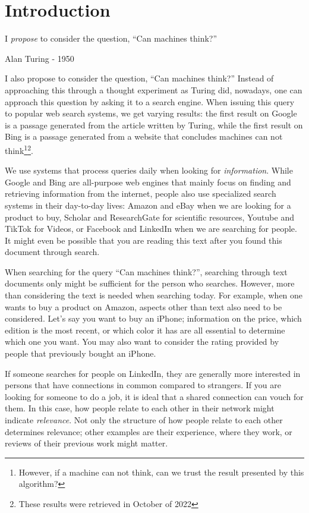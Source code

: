\chapter{Introduction}
\label{chp:introduction}
\epigraph{I \textit{propose} to consider the question, ``Can machines think?''}{Alan Turing - 1950}

I also propose to consider the question, ``Can machines think?'' Instead of approaching this through a thought experiment as Turing did, nowadays, one can approach this question by asking it to a search engine. When issuing this query to popular web search systems, we get varying results: the first result on Google is a passage generated from the article written by Turing, while the first result on Bing is a passage generated from a website that concludes machines can not think\footnote{However, if a machine can not think, can we trust the result presented by this algorithm?}\footnote{These results were retrieved in October of 2022}.

We use systems that process queries daily when looking for \textit{information}. While Google and Bing are all-purpose web engines that mainly focus on finding and retrieving information from the internet, people also use specialized search systems in their day-to-day lives: Amazon and eBay when we are looking for a product to buy, Scholar and ResearchGate for scientific resources, Youtube and TikTok for Videos, or Facebook and LinkedIn when we are searching for people. It might even be possible that you are reading this text after you found this document through search. 

When searching for the query ``Can machines think?'', searching through text documents only might be sufficient for the person who searches. However, more than considering the text is needed when searching today. For example, when one wants to buy a product on Amazon, aspects other than text also need to be considered. Let's say you want to buy an iPhone; information on the price, which edition is the most recent, or which color it has are all essential to determine which one you want. You may also want to consider the rating provided by people that previously bought an iPhone.

If someone searches for people on LinkedIn, they are generally more interested in persons that have connections in common compared to strangers. If you are looking for someone to do a job, it is ideal that a shared connection can vouch for them. In this case, how people relate to each other in their network might indicate \textit{relevance}. Not only the structure of how people relate to each other determines relevance; other examples are their experience, where they work, or reviews of their previous work might matter.

